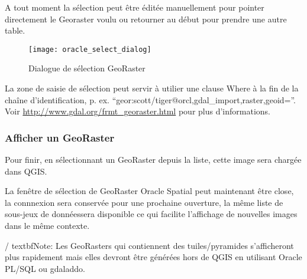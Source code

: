 
A tout moment la sélection peut être éditée manuellement pour pointer directement le Georaster voulu ou retourner au début pour prendre une autre table.

\begin{figure}[ht]
   \begin{center}
   \caption{Dialogue de sélection GeoRaster \nixcaption}\label{fig:oracle_select}\smallskip
   \texttt{[image: oracle\_select\_dialog]}
\end{center}
\end{figure}


La zone de saisie de sélection peut servir à utilier une clause Where à la fin de la chaîne d'identification, p. ex. ``geor:scott/tiger@orcl,gdal\_import,raster,geoid=''. Voir \url{http://www.gdal.org/frmt_georaster.html} pour plus d'informations.

\subsubsection{Afficher un GeoRaster}

Pour finir, en sélectionnant un GeoRaster depuis la liste, cette image sera chargée dans QGIS.


La fenêtre de sélection de GeoRaster Oracle Spatial peut maintenant être close, la connnexion sera conservée pour une prochaine ouverture, la même liste de sous-jeux de donnéessera disponible ce qui facilite l'affichage de nouvelles images dans le même contexte.

/%
textbf{Note:} Les GeoRasters qui contiennent des tuiles/pyramides s'afficheront plus rapidement mais elles devront être générées hors de QGIS en utilisant Oracle PL/SQL ou gdaladdo.

